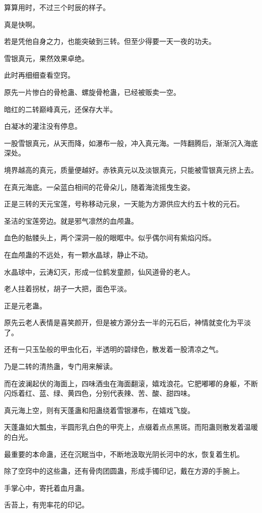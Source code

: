 \begin{this_body}
算算用时，不过三个时辰的样子。

真是快啊。

若是凭他自身之力，也能突破到三转。但至少得要一天一夜的功夫。

雪银真元，果然效果卓绝。

此时再细细查看空窍。

原先一片惨白的骨枪蛊、螺旋骨枪蛊，已经被贩卖一空。

暗红的二转巅峰真元，还保存大半。

白凝冰的灌注没有停息。

一股雪银真元，从天而降，如瀑布一般，冲入真元海。一阵翻腾后，渐渐沉入海底深处。

境界越高的真元，质量便越好。赤铁真元以及淡银真元，只能被雪银真元挤上去。

在真元海底。一朵蓝白相间的花骨朵儿，随着海流摇曳生姿。

正是三转的天元宝莲，号称移动元泉，一天能为方源供应大约五十枚的元石。

圣洁的宝莲旁边。就是邪气凛然的血颅蛊。

血色的骷髅头上，两个深洞一般的眼眶中。似乎偶尔间有紫焰闪烁。

在血颅蛊的不远处，有一颗水晶球，静止不动。

水晶球中，云涛幻灭，形成一位鹤发童颜，仙风道骨的老人。

老人拄着拐杖，胡子一大把，面色平淡。

正是元老蛊。

原先云老人表情是喜笑颜开，但是被方源分去一半的元石后，神情就变化为平淡了。

还有一只玉坠般的甲虫化石，半透明的碧绿色，散发着一股清凉之气。

乃是二转的清热蛊，专门用来解读。

而在波澜起伏的海面上，四味酒虫在海面翻滚，嬉戏浪花。它肥嘟嘟的身躯，不断闪烁着红、蓝、绿、黄四色，分别代表辣、苦、酸、甜四味。

真元海上空，则有天蓬蛊和阳蛊绕着雪银瀑布，在嬉戏飞旋。

天蓬蛊如大瓢虫，半圆形乳白色的甲壳上，点缀着点点黑斑。而阳蛊则散发着温暖的白光。

最重要的本命蛊，还在沉眠当中，不断地汲取光阴长河中的水，恢复着生机。

除了空窍中的这些蛊，还有骨肉团圆蛊，形成手镯印记，戴在方源的手腕上。

手掌心中，寄托着血月蛊。

舌苔上，有兜率花的印记。


\end{this_body}
